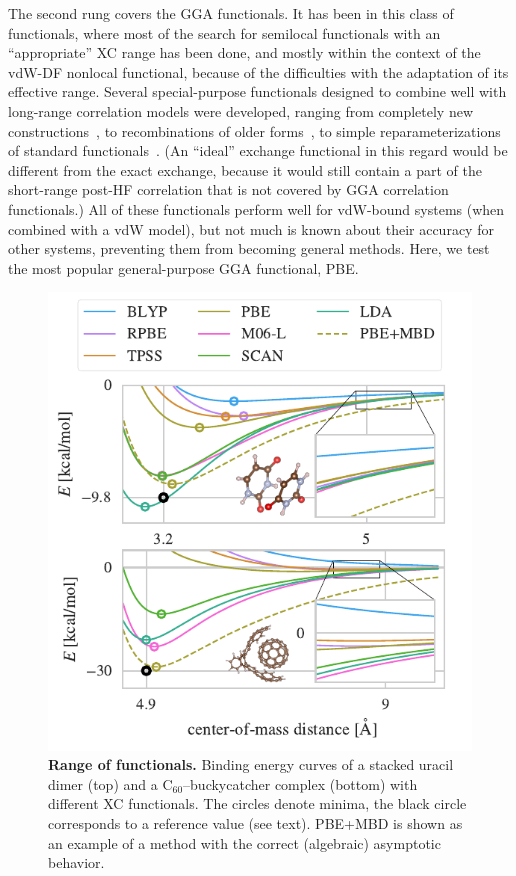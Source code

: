 The second rung covers the GGA functionals.
It has been in this class of functionals, where most of the search for semilocal functionals with an ``appropriate'' XC range has been done, and mostly within the context of the vdW-DF nonlocal functional, because of the difficulties with the adaptation of its effective range.
Several special-purpose functionals designed to combine well with long-range correlation models were developed, ranging from completely new constructions~\cite{PernalPRL09,WellendorffPRB12}, to recombinations of older forms~\cite{CooperPRB10,HamadaPRB14,BerlandPRB14}, to simple reparameterizations of standard functionals~\cite{ZhangPRL98,KlimesJPCM10,KlimesPRB11}.
(An ``ideal'' exchange functional in this regard would be different from the exact exchange, because it would still contain a part of the short-range post-HF correlation that is not covered by GGA correlation functionals.)
All of these functionals perform well for vdW-bound systems (when combined with a vdW model), but not much is known about their accuracy for other systems, preventing them from becoming general methods.
Here, we test the most popular general-purpose GGA functional, PBE\@.

\begin{figure}[t]
\includegraphics[center]{media/range-curves}
\caption{\textbf{Range of functionals.}
Binding energy curves of a stacked uracil dimer (top) and a C$_{60}$--buckycatcher complex (bottom) with different XC functionals.
The circles denote minima, the black circle corresponds to a reference value (see text).
PBE+MBD is shown as an example of a method with the correct (algebraic) asymptotic behavior.
}\label{fig:range}
\end{figure}

